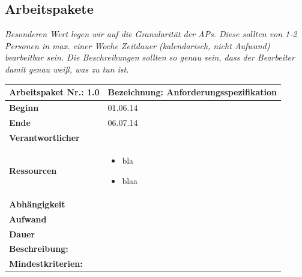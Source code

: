 \documentclass[fontsize=12pt,paper=a4,twoside]{scrartcl}
\begin{document}
\subsection{Arbeitspakete}\label{aps}


{\em Besonderen Wert legen wir auf die Granularität der APs. Diese
  sollten von 1-2 Personen in max. einer Woche Zeitdauer (kalendarisch, nicht
  Aufwand) bearbeitbar sein. Die Beschreibungen sollten so genau sein,
  dass der Bearbeiter damit genau weiß, was zu tun ist.}
  

\begin{tabular}{|p{5.3cm}|p{9.7cm}|}\hline
	\textbf{Arbeitspaket Nr.:} 1.0 & \textbf{Bezeichnung:} Anforderungsspezifikation\\ \hline \hline
	\textbf{Beginn} & 01.06.14\\ \hline
	\textbf{Ende} & 06.07.14\\ \hline
	\textbf{Verantwortlicher} & \\ \hline
	\textbf{Ressourcen} & \begin{itemize}
		\item bla
		\item blaa
	\end{itemize}    \\ \hline
	\textbf{Abhängigkeit} &\\ \hline
	\textbf{Aufwand} & \\ \hline
	\textbf{Dauer} & \\ \hline
	\multicolumn{2}{|p{15cm}|}{\textbf{Beschreibung:}\newline   }\\ \hline
	\multicolumn{2}{|p{15cm}|}{\textbf{Mindestkriterien:}\newline }\\ \hline
\end{tabular}

\begin{verbatim} 
\end{verbatim}
\end{document}

